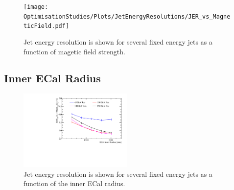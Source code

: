\begin{figure}
  \texttt{[image: OptimisationStudies/Plots/JetEnergyResolutions/JER\_vs\_MagneticField.pdf]}
  \caption[Jet energy resolution as a function of magnetic field strength.]{Jet energy resolution is shown for several fixed energy jets as a function of magetic field strength.}
  \label{optstud:fig:bfield}
\end{figure}

\subsection{Inner ECal Radius}
\label{optstud:sec:glob:ecalinnerrad}

\begin{figure}
  \includegraphics[width=0.5\textwidth]{OptimisationStudies/Plots/JetEnergyResolutions/JER_vs_ECalInnerRadius.pdf}
  \caption[Jet energy resolution as a function of the ECal inner radius.]{Jet energy resolution is shown for several fixed energy jets as a function of the inner ECal radius.}
  \label{optstud:fig:ecalinnerrad}
\end{figure}

\fi

